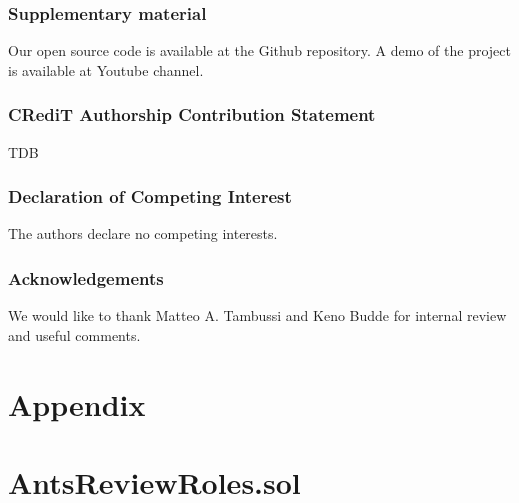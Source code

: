 \documentclass[runningheads]{llncs}
\begin{document}
\subsubsection{Supplementary material}
Our open source code is available at the Github repository. A demo of the project is available at Youtube channel.

\subsubsection{CRediT Authorship Contribution Statement}
TDB

\subsubsection{Declaration of Competing Interest}
The authors declare no competing interests.

\subsubsection{Acknowledgements} We would like to thank Matteo A. Tambussi and Keno Budde for internal review and useful comments.

\newpage

\section{Appendix}

\appendix

\section{AntsReviewRoles.sol}
\label{appendix:a}
\end{document}
